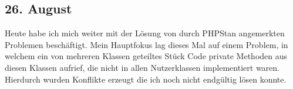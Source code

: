 \subsection{26. August}
Heute habe ich mich weiter mit der Lösung von durch PHPStan angemerkten Problemen beschäftigt. Mein Hauptfokus lag dieses Mal auf einem Problem, in welchem ein von mehreren Klassen geteiltes Stück Code private Methoden aus diesen Klassen aufrief, die nicht in allen Nutzerklassen implementiert waren. Hierdurch wurden Konflikte erzeugt die ich noch nicht endgültig lösen konnte.